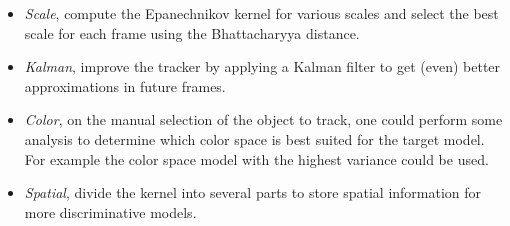 \documentclass[11pt]{article}
\begin{document}
\begin{itemize}
\item{\emph{Scale}, compute the Epanechnikov kernel for various scales and
select the best scale for each frame using the Bhattacharyya distance.}
\item{\emph{Kalman}, improve the tracker by applying a Kalman filter to get
(even) better approximations in future frames.}
\item{\emph{Color}, on the manual selection of the object to track, one could
perform some analysis to determine which color space is best suited for the
target model. For example the color space model with the highest variance could
be used.}
\item{\emph{Spatial}, divide the kernel into several parts to store spatial
information for more discriminative models.}
\end{itemize}

\renewcommand\bibname{References}


\end{document}
